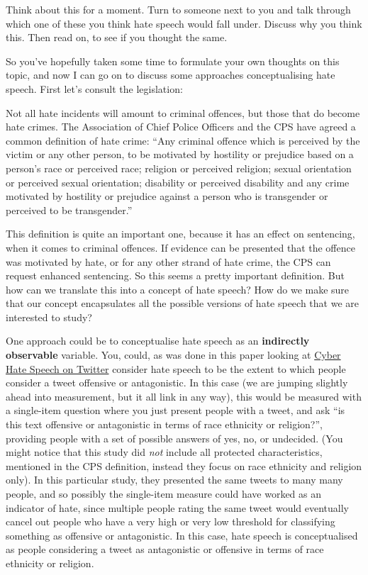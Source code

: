 \documentclass[]{book}
\theoremstyle{definition}
\theoremstyle{definition}
\theoremstyle{definition}
\theoremstyle{remark}
\begin{document}
Think about this for a moment. Turn to someone next to you and talk
through which one of these you think hate speech would fall under.
Discuss why you think this. Then read on, to see if you thought the
same.

So you've hopefully taken some time to formulate your own thoughts on
this topic, and now I can go on to discuss some approaches
conceptualising hate speech. First let's consult the legislation:

Not all hate incidents will amount to criminal offences, but those that
do become hate crimes. The Association of Chief Police Officers and the
CPS have agreed a common definition of hate crime: ``Any criminal
offence which is perceived by the victim or any other person, to be
motivated by hostility or prejudice based on a person's race or
perceived race; religion or perceived religion; sexual orientation or
perceived sexual orientation; disability or perceived disability and any
crime motivated by hostility or prejudice against a person who is
transgender or perceived to be transgender.''

This definition is quite an important one, because it has an effect on
sentencing, when it comes to criminal offences. If evidence can be
presented that the offence was motivated by hate, or for any other
strand of hate crime, the CPS can request enhanced sentencing. So this
seems a pretty important definition. But how can we translate this into
a concept of hate speech? How do we make sure that our concept
encapsulates all the possible versions of hate speech that we are
interested to study?

One approach could be to conceptualise hate speech as an
\textbf{indirectly observable} variable. You, could, as was done in this
paper looking at
\href{http://onlinelibrary.wiley.com/doi/10.1002/poi3.85/full}{Cyber
Hate Speech on Twitter} consider hate speech to be the extent to which
people consider a tweet offensive or antagonistic. In this case (we are
jumping slightly ahead into measurement, but it all link in any way),
this would be measured with a single-item question where you just
present people with a tweet, and ask ``is this text offensive or
antagonistic in terms of race ethnicity or religion?'', providing people
with a set of possible answers of yes, no, or undecided. (You might
notice that this study did \emph{not} include all protected
characteristics, mentioned in the CPS definition, instead they focus on
race ethnicity and religion only). In this particular study, they
presented the same tweets to many many people, and so possibly the
single-item measure could have worked as an indicator of hate, since
multiple people rating the same tweet would eventually cancel out people
who have a very high or very low threshold for classifying something as
offensive or antagonistic. In this case, hate speech is conceptualised
as people considering a tweet as antagonistic or offensive in terms of
race ethnicity or religion.
\end{document}
